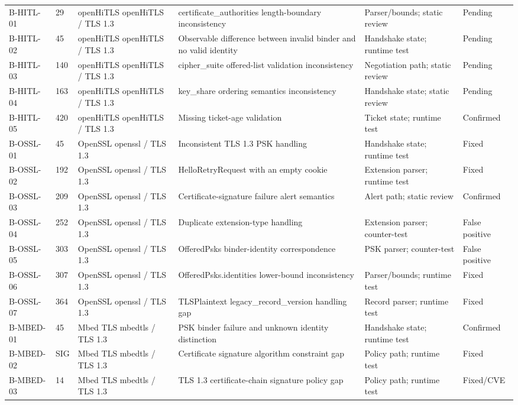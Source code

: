 \begin{table}[p]
\begin{tabular}{p{}p{}p{}p{}p{}p{}}
B-HITL-01 & 29 & openHiTLS openHiTLS / TLS 1.3 & certificate\_authorities length-boundary inconsistency & Parser/bounds; static review & Pending \\
B-HITL-02 & 45 & openHiTLS openHiTLS / TLS 1.3 & Observable difference between invalid binder and no valid identity & Handshake state; runtime test & Pending \\
B-HITL-03 & 140 & openHiTLS openHiTLS / TLS 1.3 & cipher\_suite offered-list validation inconsistency & Negotiation path; static review & Pending \\
B-HITL-04 & 163 & openHiTLS openHiTLS / TLS 1.3 & key\_share ordering semantics inconsistency & Handshake state; static review & Pending \\
B-HITL-05 & 420 & openHiTLS openHiTLS / TLS 1.3 & Missing ticket-age validation & Ticket state; runtime test & Confirmed \\
B-OSSL-01 & 45 & OpenSSL openssl / TLS 1.3 & Inconsistent TLS 1.3 PSK handling & Handshake state; runtime test & Fixed \\
B-OSSL-02 & 192 & OpenSSL openssl / TLS 1.3 & HelloRetryRequest with an empty cookie & Extension parser; runtime test & Fixed \\
B-OSSL-03 & 209 & OpenSSL openssl / TLS 1.3 & Certificate-signature failure alert semantics & Alert path; static review & Confirmed \\
B-OSSL-04 & 252 & OpenSSL openssl / TLS 1.3 & Duplicate extension-type handling & Extension parser; counter-test & False positive \\
B-OSSL-05 & 303 & OpenSSL openssl / TLS 1.3 & OfferedPsks binder-identity correspondence & PSK parser; counter-test & False positive \\
B-OSSL-06 & 307 & OpenSSL openssl / TLS 1.3 & OfferedPsks.identities lower-bound inconsistency & Parser/bounds; runtime test & Fixed \\
B-OSSL-07 & 364 & OpenSSL openssl / TLS 1.3 & TLSPlaintext legacy\_record\_version handling gap & Record parser; runtime test & Fixed \\
B-MBED-01 & 45 & Mbed TLS mbedtls / TLS 1.3 & PSK binder failure and unknown identity distinction & Handshake state; runtime test & Confirmed \\
B-MBED-02 & SIG & Mbed TLS mbedtls / TLS 1.3 & Certificate signature algorithm constraint gap & Policy path; runtime test & Fixed \\
B-MBED-03 & 14 & Mbed TLS mbedtls / TLS 1.3 & TLS 1.3 certificate-chain signature policy gap & Policy path; runtime test & Fixed/CVE \\

\end{tabular}
\end{table}
